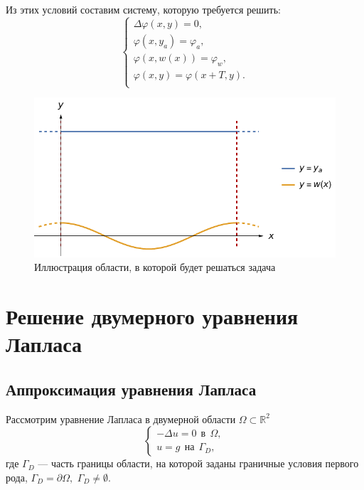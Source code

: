 \documentclass[12pt, a4paper]{article}
\renewcommand{\phi}{\varphi}
\begin{document}
			Из этих условий составим систему, которую требуется решить: 		
			\begin{equation}
				\begin{cases}
					\Delta \phi (x, y)  = 0, \\
					\phi (x, y_a) = \phi_a, \\
					\phi (x, w(x)) = \phi_w, \\
					\phi (x, y) = \phi (x + T, y).\\
					
				\end{cases}
			\end{equation}
			\begin{figure}[!h]
				\centering
				\includegraphics[width=1\textwidth]{illustr.pdf}
				\caption{Иллюстрация области, в которой будет решаться задача}
				\label{fig:illustr_1}
			\end{figure}
	
	\newpage
	\section{Решение двумерного уравнения Лапласа}
		
		
		\subsection{Аппроксимация уравнения Лапласа}
		
			Рассмотрим уравнение Лапласа в двумерной области $\Omega \subset \mathbb{R}^2$
			\begin{equation*}
				\begin{cases}
					- \Delta u  = 0 \ \  \text{в}\ \  \Omega, \\
					u = g \ \ \text{на}\ \  \Gamma_D,
				\end{cases}			
			\end{equation*}
			где $\Gamma_D$ --- часть границы области, на которой заданы граничные условия первого рода, $\Gamma_D = \partial \Omega,$  $\Gamma_D \ne \emptyset$. 
			
\end{document}

